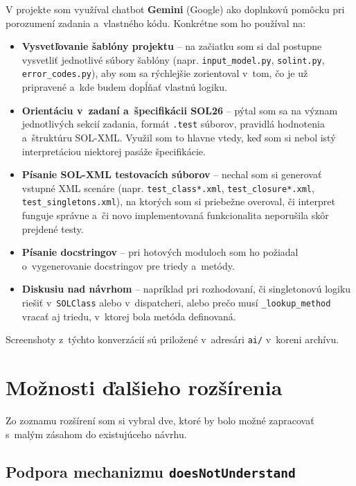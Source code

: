 \documentclass[a4paper, 11pt]{article}
\begin{document}
V projekte som využíval chatbot \textbf{Gemini} (Google) ako
doplnkovú pomôcku pri porozumení zadania a~vlastného kódu.
Konkrétne som ho používal na:

\begin{itemize}[nosep]
    \item \textbf{Vysvetľovanie šablóny projektu} -- na začiatku som si
    dal postupne vysvetliť jednotlivé súbory šablóny (napr.
    \texttt{input\_model.py}, \texttt{solint.py}, \texttt{error\_codes.py}),
    aby som sa rýchlejšie zorientoval v~tom, čo je už pripravené a~kde
    budem dopĺňať vlastnú logiku.
    \item \textbf{Orientáciu v~zadaní a~špecifikácii SOL26} -- pýtal som
    sa na význam jednotlivých sekcií zadania, formát \texttt{.test}
    súborov, pravidlá hodnotenia a~štruktúru SOL-XML. Využil som to
    hlavne vtedy, keď som si nebol istý interpretáciou niektorej pasáže
    špecifikácie.
    \item \textbf{Písanie SOL-XML testovacích súborov} -- nechal som si
    generovať vstupné XML scenáre (napr. \texttt{test\_class*.xml},
    \texttt{test\_closure*.xml}, \texttt{test\_singletons.xml}), na ktorých
    som si priebežne overoval, či interpret funguje správne a~či
    novo implementovaná funkcionalita neporušila skôr prejdené testy.
    \item \textbf{Písanie docstringov} -- pri hotových moduloch som ho
    požiadal o~vygenerovanie docstringov pre triedy a~metódy.
    \item \textbf{Diskusiu nad návrhom} -- napríklad pri rozhodovaní,
    či singletonovú logiku riešiť v~\texttt{SOLClass} alebo
    v~dispatcheri, alebo prečo musí \texttt{\_lookup\_method} vracať aj
    triedu, v~ktorej bola metóda definovaná.
\end{itemize}

Screenshoty z~týchto konverzácií sú priložené v~adresári \texttt{ai/}
v~koreni archívu.

\section{Možnosti ďalšieho rozšírenia}

Zo zoznamu rozšírení som si vybral dve, ktoré by bolo možné zapracovať
s~malým zásahom do existujúceho návrhu.

\subsection*{Podpora mechanizmu \texttt{doesNotUnderstand}}
\end{document}

